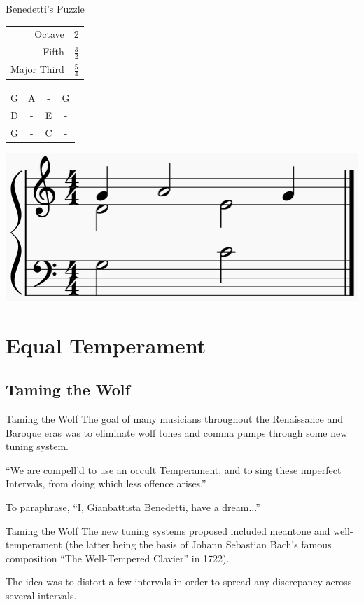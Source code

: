 \documentclass{beamer}
\begin{document}
\begin{frame}{Benedetti's Puzzle}
    \begin{tabular}{r|l}
        Octave & 2 \\
        Fifth & $\frac{3}{2}$ \\
        Major Third & $\frac{5}{4}$
    \end{tabular}
    \hspace{1cm}
    \begin{tabular}{cccc}
        G & A & - & G \\
        D & - & E & - \\
        G & - & C & -
    \end{tabular}
    \includegraphics[width=\textwidth]{benedetti-puzzle.png}
\end{frame}

\section{Equal Temperament}
\subsection{Taming the Wolf}
\begin{frame}{Taming the Wolf}
    \pause The goal of many musicians throughout the Renaissance and Baroque eras was to eliminate wolf tones and comma pumps through some new tuning system.
    
    \pause ``We are compell’d to use an occult Temperament, and to sing these imperfect Intervals, from doing which less offence arises.''
    
    \pause To paraphrase, ``I, Gianbattista Benedetti, have a dream...''
\end{frame}

\begin{frame}{Taming the Wolf}
    \pause The new tuning systems proposed included meantone and well-temperament (the latter being the basis of Johann Sebastian Bach's famous composition ``The Well-Tempered Clavier'' in 1722).
    
    \pause The idea was to distort a few intervals in order to spread any discrepancy across several intervals.
\end{frame}
\end{document}

